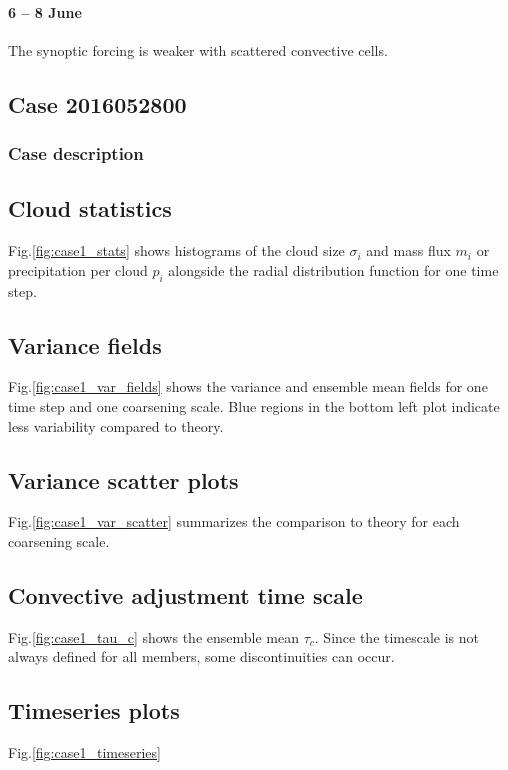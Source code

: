 \documentclass[a4paper, 12pt]{article}
\begin{document}
\paragraph{6 -- 8 June} The synoptic forcing is weaker with scattered convective cells.


\subsection{Case 2016052800}
\subsubsection{Case description}


\subsection{Cloud statistics}
Fig.\ref{fig:case1_stats} shows histograms of the cloud size $\sigma_i$ and mass flux $m_i$ or precipitation per cloud $p_i$ alongside the radial distribution function for one time step. 

\subsection{Variance fields}
Fig.\ref{fig:case1_var_fields} shows the variance and ensemble mean fields for one time step and one coarsening scale. Blue regions in the bottom left plot indicate less variability compared to theory.

\subsection{Variance scatter plots}
Fig.\ref{fig:case1_var_scatter} summarizes the comparison to theory for each coarsening scale.

\subsection{Convective adjustment time scale}
Fig.\ref{fig:case1_tau_c} shows the ensemble mean $\tau_c$. Since the timescale is not always defined for all members, some discontinuities can occur. 

\subsection{Timeseries plots}
Fig.\ref{fig:case1_timeseries}
\end{document}
